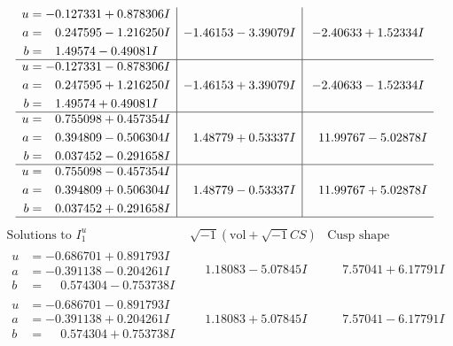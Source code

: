 \documentclass[1p]{elsarticle_modified}
\theoremstyle{definition}
\newcommand{\I}{\sqrt{-1}}
\begin{document}
$$\begin{array}{c|c|c}
\begin{aligned}
u &= -0.127331 + 0.878306 I \\
a &= \phantom{-}0.247595 - 1.216250 I \\
b &= \phantom{-}1.49574 - 0.49081 I\end{aligned}
 & -1.46153 - 3.39079 I & -2.40633 + 1.52334 I \\ \hline\begin{aligned}
u &= -0.127331 - 0.878306 I \\
a &= \phantom{-}0.247595 + 1.216250 I \\
b &= \phantom{-}1.49574 + 0.49081 I\end{aligned}
 & -1.46153 + 3.39079 I & -2.40633 - 1.52334 I \\ \hline\begin{aligned}
u &= \phantom{-}0.755098 + 0.457354 I \\
a &= \phantom{-}0.394809 - 0.506304 I \\
b &= \phantom{-}0.037452 - 0.291658 I\end{aligned}
 & \phantom{-}1.48779 + 0.53337 I & \phantom{-}11.99767 - 5.02878 I \\ \hline\begin{aligned}
u &= \phantom{-}0.755098 - 0.457354 I \\
a &= \phantom{-}0.394809 + 0.506304 I \\
b &= \phantom{-}0.037452 + 0.291658 I\end{aligned}
 & \phantom{-}1.48779 - 0.53337 I & \phantom{-}11.99767 + 5.02878 I\\
 \hline 
 \end{array}$$\newpage$$\begin{array}{c|c|c}  
\text{Solutions to }I^u_{1}& \I (\text{vol} + \sqrt{-1}CS) & \text{Cusp shape}\\
 \hline 
\begin{aligned}
u &= -0.686701 + 0.891793 I \\
a &= -0.391138 - 0.204261 I \\
b &= \phantom{-}0.574304 - 0.753738 I\end{aligned}
 & \phantom{-}1.18083 - 5.07845 I & \phantom{-}7.57041 + 6.17791 I \\ \hline\begin{aligned}
u &= -0.686701 - 0.891793 I \\
a &= -0.391138 + 0.204261 I \\
b &= \phantom{-}0.574304 + 0.753738 I\end{aligned}
 & \phantom{-}1.18083 + 5.07845 I & \phantom{-}7.57041 - 6.17791 I \\ \hline\begin{aligned}

\end{aligned}
\end{array}$$
\end{document}
